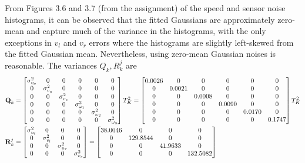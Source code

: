 \documentclass[a4paper]{article}
\begin{document}
From Figures 3.6 and 3.7 (from the assignment) of the speed and sensor noise histograms, it can be observed that the fitted Gaussians are approximately zero-mean and capture much of the variance in the histograms, with the only exceptions in $v_l$ and $v_r$ errors where the histograms are slightly left-skewed from the fitted Gaussian mean. Nevertheless, using zero-mean Gaussian noises is reasonable. The variances $Q_k, R^j_k$ are
\begin{align*}
    \bm{\mathbf{Q}}_k 
    &= \begin{bmatrix} 
        \sigma_{v_x}^2 & 0 & 0 & 0 & 0 & 0 \\ 
        0 & \sigma_{v_y}^2 & 0 & 0 & 0 & 0 \\ 
        0 & 0 & \sigma_{v_z}^2 & 0 & 0 & 0 \\ 
        0 & 0 & 0 & \sigma_{\omega_1}^2 & 0 & 0 \\ 
        0 & 0 & 0 & 0 & \sigma_{\omega_2}^2 & 0 \\ 
        0 & 0 & 0 & 0 & 0 & \sigma_{\omega_3}^2 
    \end{bmatrix} T_K^2 
    = \begin{bmatrix} 
        0.0026 & 0 & 0 & 0 & 0 & 0 \\ 
        0 & 0.0021 & 0 & 0 & 0 & 0 \\ 
        0 & 0 & 0.0008 & 0 & 0 & 0 \\ 
        0 & 0 & 0 & 0.0090 & 0 & 0 \\ 
        0 & 0 & 0 & 0 & 0.0170 & 0 \\ 
        0 & 0 & 0 & 0 & 0 & 0.1747 
    \end{bmatrix} T_K^2 \\ 
    \bm{\mathbf{R}}^j_k 
    &= \begin{bmatrix}
        \sigma_{u_l}^2 & 0 & 0 & 0 \\
        0 & \sigma_{v_l}^2 & 0 & 0 \\
        0 & 0 & \sigma_{u_r}^2 & 0 \\
        0 & 0 & 0 & \sigma_{v_r}^2
    \end{bmatrix} 
    = \begin{bmatrix}
        38.0046 & 0 & 0 & 0 \\
        0 & 129.8544 & 0 & 0 \\
        0 & 0 & 41.9633 & 0 \\
        0 & 0 & 0 & 132.5082
    \end{bmatrix}
\end{align*}
\end{document}
